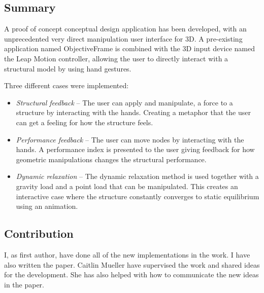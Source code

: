 \subsection*{Summary}

A proof of concept conceptual design application has been developed, with an unprecedented very direct manipulation user interface for 3D. A pre-existing application named ObjectiveFrame \cite{lindemann2001objectiveframe} is combined with the 3D input device named the Leap Motion controller, allowing the user to directly interact with a structural model by using hand gestures.

Three different cases were implemented:

\begin{itemize} 
\item \textit{Structural feedback} – The user can apply and manipulate, a force to a structure by interacting with the hands. Creating a metaphor that the user can get a feeling for how the structure feels.
\item \textit{Performance feedback} – The user can move nodes by interacting with the hands. A performance index is presented to the user giving feedback for how geometric manipulations changes the structural performance.
\item \textit{Dynamic relaxation} – The dynamic relaxation method is used together with a gravity load and a point load that can be manipulated. This creates an interactive case where the structure constantly converges to static equilibrium using an animation.
\end{itemize} 

\subsection*{Contribution}
I, as first author, have done all of the new implementations in the work. I have also written the paper. Caitlin Mueller have supervised the work and shared ideas for the development. She has also helped with how to communicate the new ideas in the paper.
